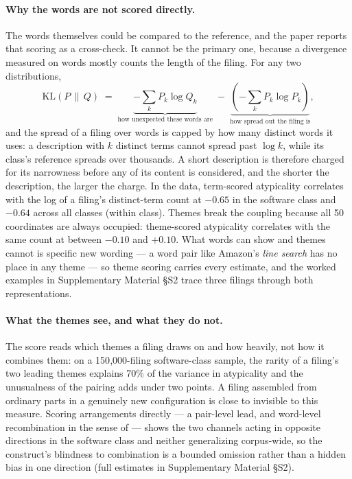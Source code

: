 \paragraph{Why the words are not scored directly.} The words themselves
could be compared to the reference, and the paper reports that scoring
as a cross-check. It cannot be the primary one, because a divergence
measured on words mostly counts the length of the filing. For any two
distributions,
\[
  \mathrm{KL}(P \,\|\, Q) \;=\; \underbrace{-\textstyle\sum_k P_k \log Q_k}_{\text{how unexpected these words are}}
  \;-\; \underbrace{\left(-\textstyle\sum_k P_k \log P_k\right)}_{\text{how spread out the filing is}} ,
\]
and the spread of a filing over words is capped by how many distinct
words it uses: a description with $k$ distinct terms cannot spread past
$\log k$, while its class's reference spreads over thousands. A short
description is therefore charged for its narrowness before any of its
content is considered, and the shorter the description, the larger the
charge. In the data, term-scored atypicality correlates with the log of
a filing's distinct-term count at $-0.65$ in the software class and
$-0.64$ across all classes (within class). Themes break the coupling
because all 50 coordinates are always occupied: theme-scored atypicality
correlates with the same count at between $-0.10$ and $+0.10$. What
words can show and themes cannot is specific new wording --- a word
pair like Amazon's \emph{line search} has no place in any theme --- so
theme scoring carries every estimate, and the worked examples in
Supplementary Material \S S2 trace three filings through both
representations.

\paragraph{What the themes see, and what they do not.} The score reads
which themes a filing draws on and how heavily, not how it combines
them: on a 150{,}000-filing software-class sample, the rarity of a
filing's two leading themes explains 70\% of the variance in
atypicality and the unusualness of the pairing adds under two points. A
filing assembled from ordinary parts in a genuinely new configuration is
close to invisible to this measure. Scoring arrangements directly ---
a pair-level lead, and word-level recombination in the sense of
\citet{Fleming2001, Uzzi2013} --- shows the two channels acting in
opposite directions in the software class and neither generalizing
corpus-wide, so the construct's blindness to combination is a bounded
omission rather than a hidden bias in one direction (full estimates in
Supplementary Material \S S2).

